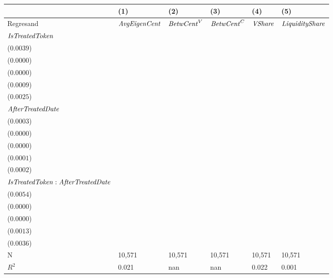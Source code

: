 \begin{tabular}{llllll}
\toprule
{} &                                      (1) &                                   (2) &                                   (3) &                                      (4) &                                      (5) \\
\midrule
Regresand                                     &                     ${\it AvgEigenCent}$ &                    ${\it BetwCent}^V$ &                    ${\it BetwCent}^C$ &                           ${\it VShare}$ &                   ${\it LiquidityShare}$ \\
${\it IsTreatedToken}$                        &    \makecell{$-0.0000^{}$ \\ ($0.0039$)} &  \makecell{$0.0000^{}$ \\ ($0.0000$)} &  \makecell{$0.0000^{}$ \\ ($0.0000$)} &    \makecell{$-0.0000^{}$ \\ ($0.0009$)} &    \makecell{$-0.0000^{}$ \\ ($0.0025$)} \\
${\it AfterTreatedDate}$                      &  \makecell{$0.0042^{***}$ \\ ($0.0003$)} &  \makecell{$0.0000^{}$ \\ ($0.0000$)} &  \makecell{$0.0000^{}$ \\ ($0.0000$)} &  \makecell{$0.0010^{***}$ \\ ($0.0001$)} &  \makecell{$0.0006^{***}$ \\ ($0.0002$)} \\
${\it IsTreatedToken}:{\it AfterTreatedDate}$ &    \makecell{$-0.0042^{}$ \\ ($0.0054$)} &  \makecell{$0.0000^{}$ \\ ($0.0000$)} &  \makecell{$0.0000^{}$ \\ ($0.0000$)} &    \makecell{$-0.0010^{}$ \\ ($0.0013$)} &    \makecell{$-0.0006^{}$ \\ ($0.0036$)} \\
\midrule N                                    &                                   10,571 &                                10,571 &                                10,571 &                                   10,571 &                                   10,571 \\
$R^2$                                         &                                    0.021 &                                   nan &                                   nan &                                    0.022 &                                    0.001 \\
\bottomrule
\end{tabular}
